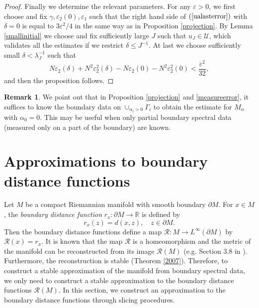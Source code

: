 \documentclass[11pt,letterpaper]{amsart}
\numberwithin{equation}{section}
\theoremstyle{definition}
\theoremstyle{plain}
\theoremstyle{definition}
\theoremstyle{plain}
\theoremstyle{definition}
\newtheorem{remark}[remark0]{Remark}
\theoremstyle{plain}
\begin{document}
\begin{proof}
Finally we determine the relevant parameters. For any $\varepsilon>0$, we first choose and fix $\gamma,\varepsilon_2(0),\varepsilon_1$ such that the right hand side of $(\ref{ualasterror})$ with $\delta=0$ is equal to $3\varepsilon^2/4$ in the same way as in Proposition \ref{projection}. By Lemma \ref{smallinitial} we choose and fix sufficiently large $J$ such that $u_{J}\in \mathcal{U}$, which validates all the estimates if we restrict $\delta\leqslant J^{-1}$. At last we choose sufficiently small $\delta<\lambda_J^{-1}$ such that
$$N\varepsilon_2(\delta)+N^2\varepsilon_2^2(\delta)-N\varepsilon_2(0)-N^2\varepsilon_2^2(0)<\frac{\varepsilon^2}{32},$$
and then the proposition follows.
\end{proof}

\begin{remark}\label{projection-partial}
We point out that in Proposition \ref{projection} and \ref{measureerror}, it suffices to know the boundary data on $\cup_{\alpha_i>0} \Gamma_i$ to obtain the estimate for $M_{\alpha}$ with $\alpha_0=0$. This may be useful when only partial boundary spectral data (measured only on a part of the boundary) are known.
\end{remark}

\section{Approximations to boundary distance functions} \label{section-appro}

Let $M$ be a compact Riemannian manifold with smooth boundary $\partial M$. For $x\in M$, the \emph{boundary distance function} $r_x:\partial M\to \mathbb{R}$ is defined by
$$r_x(z)=d(x,z),\quad z\in\partial M.$$
Then the boundary distance functions define a map $\mathcal{R}: M\to L^{\infty}(\partial M)$ by $\mathcal{R}(x)=r_x$. It is known that the map $\mathcal{R}$ is a homeomorphism and the metric of the manifold can be reconstructed from its image $\mathcal{R}(M)$ (e.g. Section 3.8 in \cite{KKL}). Furthermore, the reconstruction is stable (Theorem \ref{2007}). Therefore, to construct a stable approximation of the manifold from boundary spectral data, we only need to construct a stable approximation to the boundary distance functions $\mathcal{R}(M)$. In this section, we construct an approximation to the boundary distance functions through slicing procedures.
\end{document}
